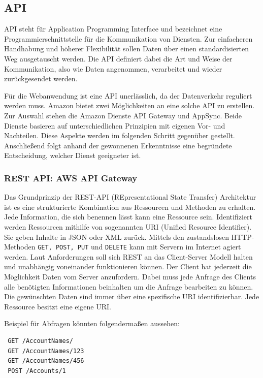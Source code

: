 

\subsection{API}
API steht für Application Programming Interface und bezeichnet eine Programmierschnittstelle für die Kommunikation von Diensten.
Zur einfacheren Handhabung und höherer Flexibilität sollen Daten über einen standardisierten Weg ausgetauscht werden. Die API definiert
dabei die Art und Weise der Kommunikation, also wie Daten angenommen, verarbeitet und wieder zurückgesendet werden.

Für die Webanwendung ist eine API unerlässlich, da der Datenverkehr reguliert werden muss.
Amazon bietet zwei Möglichkeiten an eine solche API zu erstellen.
Zur Auswahl stehen die Amazon Dienste API Gateway und AppSync.
Beide Dienste basieren auf unterschiedlichen Prinzipien mit eigenen Vor- und Nachteilen.
Diese Aspekte werden im folgenden Schritt gegenüber gestellt.
Anschließend folgt anhand der gewonnenen Erkenntnisse eine begründete Entscheidung, welcher Dienst geeigneter ist.


\subsubsection{REST API: AWS API Gateway}
Das Grundprinzip der REST-API (REpresentational State Transfer) Architektur ist es eine strukturierte Kombination aus Ressourcen und Methoden zu erhalten.
Jede Information, die sich benennen lässt kann eine Ressource sein.
Identifiziert werden Ressourcen mithilfe von sogenannten URI (Unified Resource Identifier).
Sie geben Inhalte in JSON oder XML zurück.
Mittels den zustandslosen HTTP-Methoden \verb+GET, POST, PUT+ und \verb+DELETE+ kann mit Servern im Internet agiert werden.
Laut Anforderungen soll sich REST an das Client-Server Modell halten und unabhängig voneinander funktionieren können.
Der Client hat jederzeit die Möglichkeit Daten vom Server anzufordern.
Dabei muss jede Anfrage des Clients alle benötigten Informationen beinhalten um die Anfrage bearbeiten zu können.
Die gewünschten Daten sind immer über eine spezifische URI identifizierbar.
Jede Ressource besitzt eine eigene URI.\cite[]{REST}

Beispiel für Abfragen könnten folgendermaßen aussehen:
\begin{verbatim}
 GET /AccountNames/
 GET /AccountNames/123
 GET /AccountNames/456
 POST /Accounts/1
\end{verbatim}

